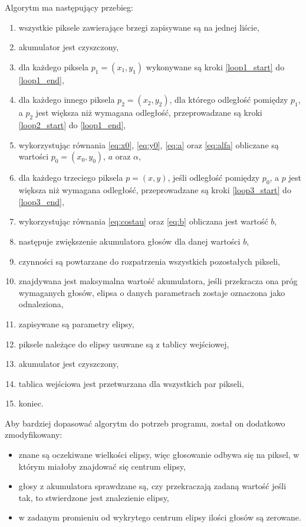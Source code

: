 \documentclass{classrep}
\begin{document}
Algorytm ma następujący przebieg:
\begin{enumerate}
  \item wszystkie piksele zawierające brzegi zapisywane są na jednej liście,
  \item akumulator jest czyszczony,
  \item dla każdego piksela $p_1 = (x_1, y_1)$ wykonywane są kroki \ref{loop1_start} do \ref{loop1_end},
  \item dla każdego innego piksela $p_2 = (x_2, y_2)$, dla którego odległość pomiędzy $p_1$, a $p_2$ jest większa niż wymagana odległość, przeprowadzane są kroki \ref{loop2_start} do \ref{loop1_end},\label{loop1_start}
  \item wykorzystując równania \ref{eq:x0}, \ref{eq:y0}, \ref{eq:a} oraz \ref{eq:alfa} obliczane są wartości $p_0 = (x_0, y_0)$, $a$ oraz $\alpha$,\label{loop2_start}
  \item dla każdego trzeciego piksela $p = (x, y)$, jeśli odległość pomiędzy $p_0$, a $p$ jest większa niż wymagana odległość, przeprowadzane są kroki \ref{loop3_start} do \ref{loop3_end},
  \item wykorzystując równania \ref{eq:costau} oraz \ref{eq:b} obliczana jest wartość $b$,\label{loop3_start}
  \item następuje zwiększenie akumulatora głosów dla danej wartości $b$,
  \item czynności są powtarzane do rozpatrzenia wszystkich pozostałych pikseli,\label{loop3_end}
  \item znajdywana jest maksymalna wartość akumulatora, jeśli przekracza ona próg wymaganych głosów, elipsa o danych parametrach zostaje oznaczona jako odnaleziona,
  \item zapisywane są parametry elipsy,
  \item piksele należące do elipsy usuwane są z tablicy wejściowej,
  \item akumulator jest czyszczony,
  \item tablica wejściowa jest przetwarzana dla wszystkich par pikseli,\label{loop1_end}
  \item koniec.
\end{enumerate}

Aby bardziej dopasować algorytm do potrzeb programu, został on dodatkowo zmodyfikowany:
\begin{itemize}
  \item znane są oczekiwane wielkości elipsy, więc głosowanie odbywa się na piksel, w którym miałoby znajdować się centrum elipsy,
  \item głosy z akumulatora sprawdzane są, czy przekraczają zadaną wartość \ppauza jeśli tak, to stwierdzone jest znalezienie elipsy,
  \item w zadanym promieniu od wykrytego centrum elipsy ilości głosów są zerowane.
\end{itemize}
\end{document}
